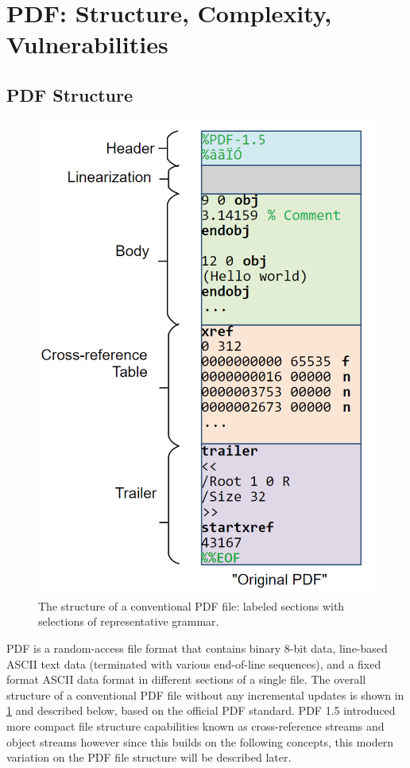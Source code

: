 \section{PDF: Structure, Complexity, Vulnerabilities}
\label{sec:pdf}

\subsection{PDF Structure}
\label{sec:pdfstructure}

\begin{figure}[t]
    \centering
    \includegraphics[width=0.65\linewidth]{figures/pdf-structure.png}
    \caption{The structure of a conventional PDF file: labeled sections with selections of representative grammar.}
    \label{fig:pdf-structure}
\end{figure}

PDF is a random-access file format that contains binary 8-bit data, line-based ASCII
text data (terminated with various end-of-line sequences), and a fixed format ASCII 
data format in different sections of a single file. The overall structure of a 
conventional PDF file without any incremental updates is shown in \cref{fig:pdf-structure} and 
described below, based on the official PDF standard.
PDF 1.5 introduced more compact file structure capabilities known as cross-reference streams 
and object streams however since this builds on the following concepts, this modern 
variation on the PDF file structure will be described later.

